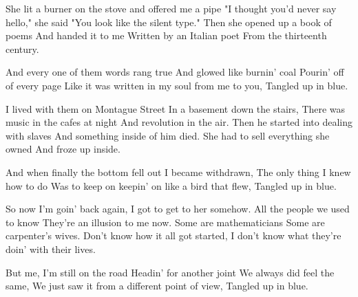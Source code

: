 \begin{guitar}
She lit a burner on the stove and offered me a pipe
"I thought you'd never say hello," she said
"You look like the silent type."
Then she opened up a book of poems
And handed it to me
Written by an Italian poet
From the thirteenth century.
       


And every one of them words rang true
And glowed like burnin' coal
Pourin' off of every page
Like it was written in my soul from me to you,
Tangled up in blue.



I lived with them on Montague Street
In a basement down the stairs,
There was music in the cafes at night
And revolution in the air.
Then he started into dealing with slaves
And something inside of him died.
She had to sell everything she owned
And froze up inside.



And when finally the bottom fell out
I became withdrawn,
The only thing I knew how to do
Was to keep on keepin' on like a bird that flew,
Tangled up in blue.



So now I'm goin' back again,
I got to get to her somehow.
All the people we used to know
They're an illusion to me now.
Some are mathematicians
Some are carpenter's wives.
Don't know how it all got started,
I don't know what they're doin' with their lives.



But me, I'm still on the road
Headin' for another joint
We always did feel the same,
We just saw it from a different point of view,
Tangled up in blue.
\end{guitar}
